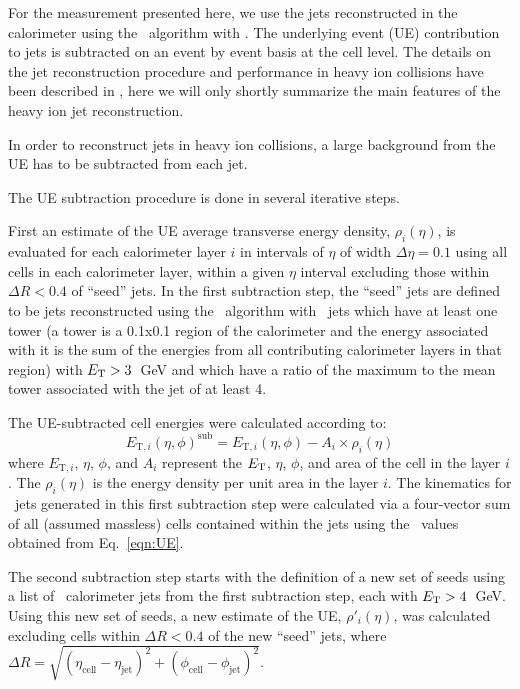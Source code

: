 
\label{Sec:JetRec}
For the measurement presented here, we use the jets reconstructed in the calorimeter 
using the \antikt\ algorithm \cite{Cacciari:2008gp} with \RFour.
The underlying event (UE) contribution to jets is subtracted on 
an event by event basis at the cell level.
The details on the jet reconstruction 
procedure and performance in heavy ion collisions have been described in 
\cite{ATLAS-COM-PHYS-2011-1733}, here we will only shortly summarize the main 
features of the heavy ion jet reconstruction.

In order to reconstruct jets in heavy ion collisions, a large background from 
the UE has to be subtracted from each jet.

The UE subtraction procedure is done in several iterative steps.

First an estimate of the UE average transverse energy density, $\rho_i(\eta)$, 
is evaluated for each calorimeter layer $i$ in intervals of $\eta$ of width 
$\Delta \eta = 0.1$ using all cells in each calorimeter layer, within a given 
$\eta$ interval excluding those within $\Delta R < 0.4$ of ``seed'' jets.
In the first 
subtraction step, the ``seed'' jets are defined to be jets reconstructed using the 
\antikt\ algorithm with \RTwo\ jets which have at 
least one tower  (a tower is a 0.1x0.1 region of the calorimeter and the energy
associated with it is the sum of the energies from all contributing calorimeter layers
in that region)
with $\mbox{$E_{\mathrm{T}}$} > 3$~GeV and which have a ratio of the maximum to 
the mean tower associated with the jet of at least 4.

  The UE-subtracted cell energies  were calculated according to:
\begin{equation}
\label{eqn:UE}
E_{\mathrm{T},i}(\eta, \phi)^{\mathrm{sub}} = E_{\mathrm{T},i}(\eta, \phi) - A_i \times \rho_i(\eta) 
\end{equation}
where $E_{\mathrm{T},i}$, $\eta$, $\phi$,  and $A_i$ represent the $\mbox{$E_{\mathrm{T}}$}$, $\eta$, 
$\phi$, and area of the cell in the layer $i$.
The $\rho_i(\eta)$ is the energy density per unit area in the layer $i$.
The kinematics for \RTwo\ jets 
generated in this first subtraction step were calculated via a four-vector sum 
of all (assumed massless) cells contained within the jets using the \Et\ values 
obtained from Eq.~\ref{eqn:UE}.

The second subtraction step starts with the definition of a new set of 
seeds using a list of \RTwo\ calorimeter jets from the first 
subtraction step, each with $\mbox{$E_{\mathrm{T}}$} > 4$~GeV.
Using this new set of 
seeds, a new estimate of the UE, $\rho'_i(\eta)$, was calculated excluding 
cells within $\Delta R < 0.4$ of the new ``seed'' jets, where $\Delta R = \sqrt{ 
(\eta_{\mathrm{cell}} - \eta_{\mathrm{jet}})^2 + (\phi_{\mathrm{cell}} - \phi_{\mathrm{jet}})^2}$.



